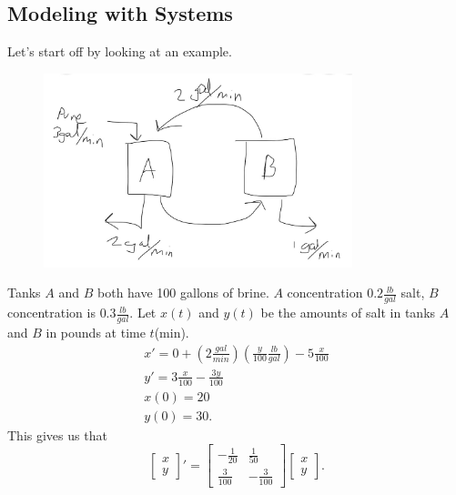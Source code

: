 \subsection{Modeling with Systems}
Let's start off by looking at an example.
\begin{eg}
  \begin{figure}[h!]
    \centering
    \includegraphics[width=0.8\textwidth]{resource/images/4.4.2 Example 1.jpg}
    \caption{}
    \label{fig:}
  \end{figure}
  Tanks $A$ and $B$ both have 100 gallons of brine. $A$ concentration $0.2 \frac{lb}{gal}$ salt, $B$ concentration is $0.3 \frac{lb}{gal}$. Let $x(t)$ and $y(t)$ be the amounts of salt in tanks $A$ and $B$ in pounds at time $t$(min).
  \begin{align*}
    x'=0+\left( 2 \frac{gal}{min} \right) \left( \frac{y}{100} \frac{lb}{gal} \right)-5 \frac{x}{100} \\
    y'=3 \frac{x}{100}- \frac{3y}{100}\\
    x(0)=20\\
    y(0)=30
  .\end{align*}
  This gives us that \[
    \begin{bmatrix} x\\y \end{bmatrix} '=\begin{bmatrix} -\frac{1}{20}&\frac{1}{50}\\\frac{3}{100}&-\frac{3}{100} \end{bmatrix} \begin{bmatrix} x\\y \end{bmatrix} 
  .\] 
\end{eg}

